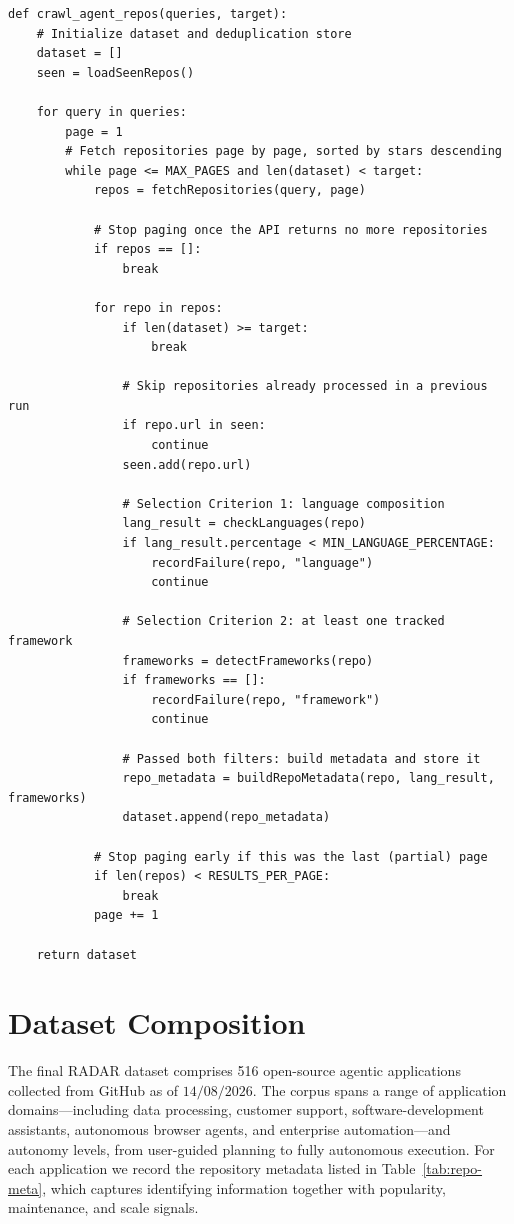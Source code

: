 \begin{lstlisting}[caption={High-level pseudocode of the repository crawler.}, label={crawler_code}]
def crawl_agent_repos(queries, target):
    # Initialize dataset and deduplication store
    dataset = []
    seen = loadSeenRepos()
 
    for query in queries:
        page = 1
        # Fetch repositories page by page, sorted by stars descending
        while page <= MAX_PAGES and len(dataset) < target:
            repos = fetchRepositories(query, page)
 
            # Stop paging once the API returns no more repositories
            if repos == []:
                break
 
            for repo in repos:
                if len(dataset) >= target:
                    break
 
                # Skip repositories already processed in a previous run
                if repo.url in seen:
                    continue
                seen.add(repo.url)
 
                # Selection Criterion 1: language composition
                lang_result = checkLanguages(repo)
                if lang_result.percentage < MIN_LANGUAGE_PERCENTAGE:
                    recordFailure(repo, "language")
                    continue
 
                # Selection Criterion 2: at least one tracked framework
                frameworks = detectFrameworks(repo)
                if frameworks == []:
                    recordFailure(repo, "framework")
                    continue
 
                # Passed both filters: build metadata and store it
                repo_metadata = buildRepoMetadata(repo, lang_result, frameworks)
                dataset.append(repo_metadata)
 
            # Stop paging early if this was the last (partial) page
            if len(repos) < RESULTS_PER_PAGE:
                break
            page += 1
 
    return dataset
\end{lstlisting}


\section{Dataset Composition}

\label{sec:dataset-composition}
 
The final RADAR dataset comprises 516 open-source agentic applications collected from GitHub as of $\text{14/08/2026}$. The corpus spans a range of application domains---including data processing, customer support, software-development assistants, autonomous browser agents, and enterprise automation---and autonomy levels, from user-guided planning to fully autonomous execution. For each application we record the repository metadata listed in Table~\ref{tab:repo-meta}, which captures identifying information together with popularity, maintenance, and scale signals.
 
